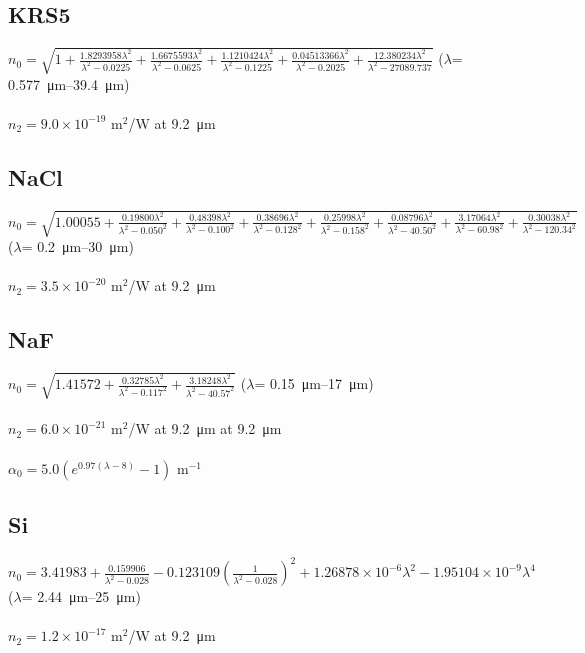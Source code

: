 \subsection*{KRS5}
$n_0=\sqrt{1+\frac{1.8293958\lambda^2}{\lambda^2-0.0225}+\frac{1.6675593\lambda^2}{\lambda^2-0.0625}+\frac{1.1210424\lambda^2}{\lambda^2-0.1225}+\frac{0.04513366\lambda^2}{\lambda^2-0.2025}+\frac{12.380234\lambda^2}{\lambda^2-27089.737}}$ (\(\lambda\)= \SIrange{0.577}{39.4}{\micro\meter}) \cite{Rodney-1956}\\
\\
$n_2 = 9.0 \times 10^{-19}$ m$^2$/W at \SI{9.2}{\micro\meter} \cite{Polyanskiy-2024}

\subsection*{NaCl}
$n_0=\sqrt{1.00055+\frac{0.19800\lambda^2}{\lambda^2-0.050^2}+\frac{0.48398\lambda^2}{\lambda^2-0.100^2}+\frac{0.38696\lambda^2}{\lambda^2-0.128^2}+\frac{0.25998\lambda^2}{\lambda^2-0.158^2}+\frac{0.08796\lambda^2}{\lambda^2-40.50^2}+\frac{3.17064\lambda^2}{\lambda^2-60.98^2}+\frac{0.30038\lambda^2}{\lambda^2-120.34^2}}$ (\(\lambda\)= \SIrange{0.2}{30}{\micro\meter}) \cite{Li-1976}\\
\\
$n_2 = 3.5 \times 10^{-20}$ m$^2$/W at \SI{9.2}{\micro\meter} \cite{Polyanskiy-2021b}

\subsection*{NaF}
$n_0=\sqrt{1.41572+\frac{0.32785\lambda^2}{\lambda^2-0.117^2}+\frac{3.18248\lambda^2}{\lambda^2-40.57^2}}$ (\(\lambda\)= \SIrange{0.15}{17}{\micro\meter}) \cite{Li-1976}\\
\\
$n_2 = 6.0 \times 10^{-21}$ m$^2$/W at \SI{9.2}{\micro\meter} at \SI{9.2}{\micro\meter} \cite{Polyanskiy-2024}\\
\\
$\alpha_0 = 5.0 (e^{0.97(\lambda-8)}-1)$ m$^{-1}$ \cite{Polyanskiy-2024}

\subsection*{Si}
$n_0=3.41983+\frac{0.159906}{\lambda^2-0.028}-0.123109\left(\frac{1}{\lambda^2-0.028}\right)^2+1.26878\times 10^{-6}\lambda^2-1.95104\times 10^{-9}\lambda^4$ (\(\lambda\)= \SIrange{2.44}{25}{\micro\meter}) \cite{Edwards-1980}\\
\\
$n_2 = 1.2\times 10^{-17}$ m$^2$/W at \SI{9.2}{\micro\meter} \cite{Polyanskiy-2024}

